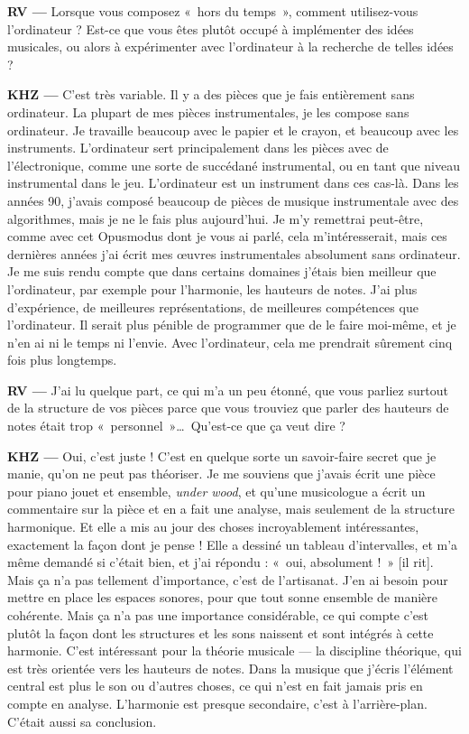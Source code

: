 \documentclass[a4paper,12pt]{article}
\newcommand{\guill}[1]{«~#1~»}
\begin{document}
\textbf{RV ---} Lorsque vous composez \guill{hors du temps}, comment utilisez-vous l'ordinateur ? Est-ce que vous êtes plutôt occupé à implémenter des idées musicales, ou alors à expérimenter avec l'ordinateur à la recherche de telles idées ?

\textbf{KHZ ---} C'est très variable. Il y a des pièces que je fais entièrement sans ordinateur. La plupart de mes pièces instrumentales, je les compose sans ordinateur. Je travaille beaucoup avec le papier et le crayon, et beaucoup avec les instruments. L'ordinateur sert principalement dans les pièces avec de l'électronique, comme une sorte de succédané instrumental, ou en tant que niveau instrumental dans le jeu. L'ordinateur est un instrument dans ces cas-là. Dans les années 90, j'avais composé beaucoup de pièces de musique instrumentale avec des algorithmes, mais je ne le fais plus aujourd'hui. Je m'y remettrai peut-être, comme avec cet Opusmodus dont je vous ai parlé, cela m'intéresserait, mais ces dernières années j'ai écrit mes œuvres instrumentales absolument sans ordinateur. Je me suis rendu compte que dans certains domaines j'étais bien meilleur que l'ordinateur, par exemple pour l'harmonie, les hauteurs de notes. J'ai plus d'expérience, de meilleures représentations, de meilleures compétences que l'ordinateur. Il serait plus pénible de programmer que de le faire moi-même, et je n'en ai ni le temps ni l'envie. Avec l'ordinateur, cela me prendrait sûrement cinq fois plus longtemps.

\textbf{RV ---} J'ai lu quelque part, ce qui m'a un peu étonné, que vous parliez surtout de la structure de vos pièces parce que vous trouviez que parler des hauteurs de notes était trop \guill{personnel}\dots~Qu'est-ce que ça veut dire ?

\textbf{KHZ ---} Oui, c'est juste ! C'est en quelque sorte un savoir-faire secret que je manie, qu'on ne peut pas théoriser. Je me souviens que j'avais écrit une pièce pour piano jouet et ensemble, \emph{under wood}, et qu'une musicologue a écrit un commentaire sur la pièce et en a fait une analyse, mais seulement de la structure harmonique. Et elle a mis au jour des choses incroyablement intéressantes, exactement la façon dont je pense ! Elle a dessiné un tableau d'intervalles, et m'a même demandé si c'était bien, et j'ai répondu : \guill{oui, absolument !} [il rit]. Mais ça n'a pas tellement d'importance, c'est de l'artisanat. J'en ai besoin pour mettre en place les espaces sonores, pour que tout sonne ensemble de manière cohérente. Mais ça n'a pas une importance considérable, ce qui compte c'est plutôt la façon dont les structures et les sons naissent et sont intégrés à cette harmonie. C'est intéressant pour la théorie musicale --- la discipline théorique, qui est très orientée vers les hauteurs de notes. Dans la musique que j'écris l'élément central est plus le son ou d'autres choses, ce qui n'est en fait jamais pris en compte en analyse. L'harmonie est presque secondaire, c'est à l'arrière-plan. C'était aussi sa conclusion.
\end{document}
